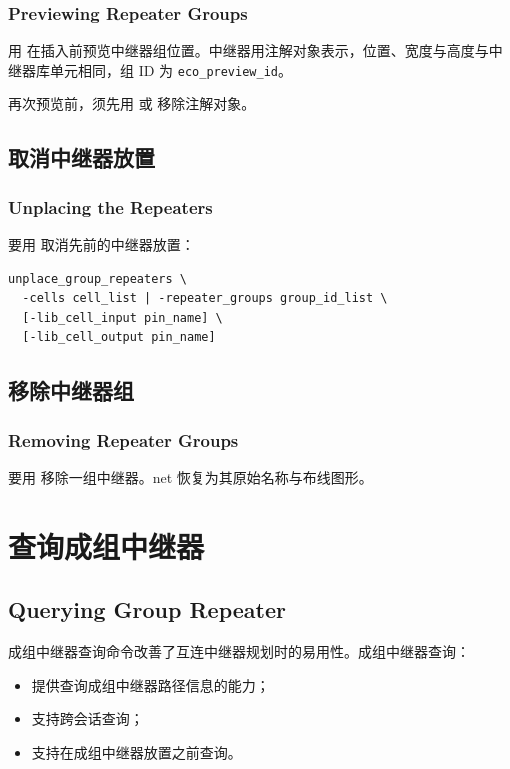 \subsubsection*{Previewing Repeater Groups}

用  在插入前预览中继器组位置。中继器用注解对象表示，位置、宽度与高度与中继器库单元相同，组 ID 为 \texttt{eco\_preview\_id}。

\begin{noteBox}
再次预览前，须先用  或  移除注解对象。
\end{noteBox}

\subsection{取消中继器放置}
\subsubsection*{Unplacing the Repeaters}

要用  取消先前的中继器放置：
\begin{lstlisting}
unplace_group_repeaters \
  -cells cell_list | -repeater_groups group_id_list \
  [-lib_cell_input pin_name] \
  [-lib_cell_output pin_name]
\end{lstlisting}

\subsection{移除中继器组}
\subsubsection*{Removing Repeater Groups}

要用  移除一组中继器。net 恢复为其原始名称与布线图形。

\section{查询成组中继器}
\subsection*{Querying Group Repeater}

成组中继器查询命令改善了互连中继器规划时的易用性。成组中继器查询：
\begin{itemize}
  \item 提供查询成组中继器路径信息的能力；
  \item 支持跨会话查询；
  \item 支持在成组中继器放置之前查询。
\end{itemize}


